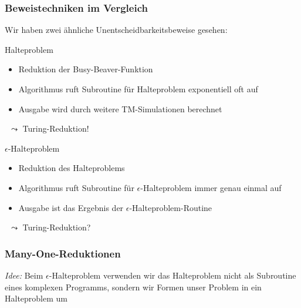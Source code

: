 \documentclass[onlymath]{beamer}
\begin{document}
\begin{frame}\frametitle{Beweistechniken im Vergleich}

Wir haben zwei ähnliche Unentscheidbarkeitsbeweise gesehen:\bigskip

\begin{minipage}{5cm}
\alert{Halteproblem}
\begin{itemize}
\item Reduktion der Busy-Beaver-Funktion
\item Algorithmus ruft Subroutine für Halteproblem exponentiell oft auf
\item Ausgabe wird durch weitere TM-Simulationen berechnet
\end{itemize}\bigskip
~\hspace{5mm}$\leadsto$ Turing-Reduktion!
\end{minipage}%
\begin{minipage}{5cm}
\alert{$\epsilon$-Halteproblem}
\begin{itemize}
\item Reduktion des Halteproblems
\item Algorithmus ruft Subroutine für $\epsilon$-Halteproblem immer genau einmal auf
\item Ausgabe ist das Ergebnis der $\epsilon$-Halteproblem-Routine
\end{itemize}\bigskip
~\hspace{5mm}$\leadsto$ Turing-Reduktion?
\end{minipage}

\end{frame}

\begin{frame}\frametitle{Many-One-Reduktionen}

\emph{Idee:} Beim $\epsilon$-Halteproblem verwenden wir das Halteproblem nicht als Subroutine eines komplexen Programms, sondern wir Formen unser Problem in ein Halteproblem um\bigskip

\pause\bigskip



\end{frame}
\end{document}
